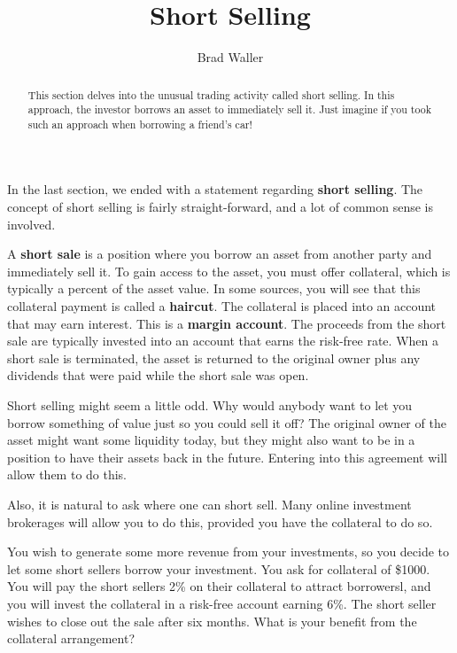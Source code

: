 \documentclass{ximera}
\author{Brad Waller}
\title{Short Selling}
\begin{document}
\begin{abstract}
This section delves into the unusual trading activity called short selling. In this approach, the investor borrows an asset to immediately sell it. Just imagine if you took such an approach when borrowing a friend's car!
\end{abstract}

\maketitle

In the last section, we ended with a statement regarding {\bf short selling}. The concept of short selling is fairly straight-forward, and a lot of common sense is involved. 

\begin{definition}\label{def{40}}
A {\bf short sale} is a position where you borrow an asset from another party and immediately sell it. To gain access to the asset, you must offer collateral, which is typically a percent of the asset value. In some sources, you will see that this collateral payment is called a {\bf haircut}. The collateral is placed into an account that may earn interest. This is a {\bf margin account}. The proceeds from the short sale are typically invested into an account that earns the risk-free rate. When a short sale is terminated, the asset is returned to the original owner plus any dividends that were paid while the short sale was open. 
\end{definition}

\begin{remark}
Short selling might seem a little odd. Why would anybody want to let you borrow something of value just so you could sell it off? The original owner of the asset might want some liquidity today, but they might also want to be in a position to have their assets back in the future. Entering into this agreement will allow them to do this.

Also, it is natural to ask where one can short sell. Many online investment brokerages will allow you to do this, provided you have the collateral to do so.
\end{remark}

\begin{example}
You wish to generate some more revenue from your investments, so you decide to let some short sellers borrow your investment. You ask for collateral of \$1000. You will pay the short sellers 2\% on their collateral to attract borrowersl, and you will invest the collateral in a risk-free account earning 6\%. The short seller wishes to close out the sale after six months. What is your benefit from the collateral arrangement?
\end{example}
\end{document}
